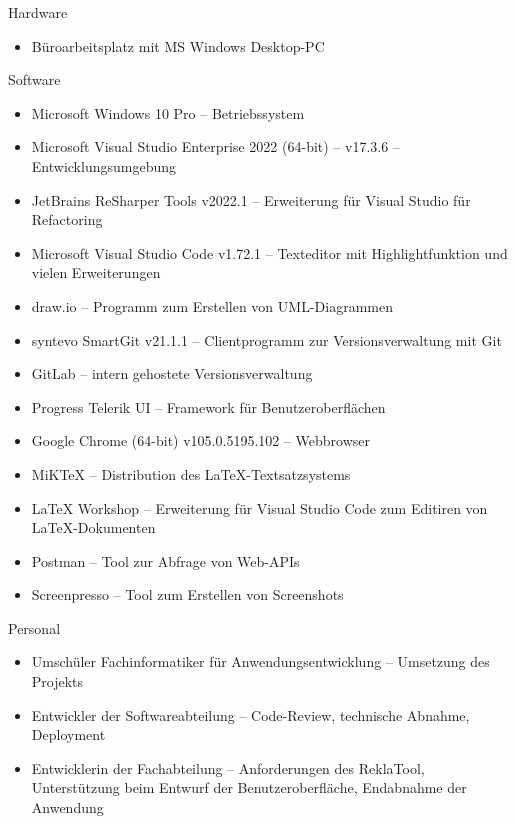 Hardware
\begin{itemize}
    \item Büroarbeitsplatz mit MS Windows Desktop-PC
\end{itemize}
Software
\begin{itemize}
    \item Microsoft Windows 10 Pro -- Betriebssystem
    \item Microsoft Visual Studio Enterprise 2022 (64-bit) -- v17.3.6 -- Entwicklungsumgebung
    \item JetBrains ReSharper Tools v2022.1 -- Erweiterung für Visual Studio für \ua Refactoring
    \item Microsoft Visual Studio Code v1.72.1 -- Texteditor mit Highlightfunktion und vielen Erweiterungen
    \item draw.io -- Programm zum Erstellen von UML-Diagrammen
    \item syntevo SmartGit v21.1.1 -- Clientprogramm zur Versionsverwaltung mit Git
    \item GitLab -- intern gehostete Versionsverwaltung
    \item Progress Telerik UI -- Framework für Benutzeroberflächen
    \item Google Chrome (64-bit) v105.0.5195.102 -- Webbrowser
    \item MiKTeX -- Distribution des LaTeX-Textsatzsystems
    \item LaTeX Workshop -- Erweiterung für Visual Studio Code zum Editiren von LaTeX-Dokumenten
    \item Postman -- Tool zur Abfrage von Web-APIs
    \item Screenpresso -- Tool zum Erstellen von Screenshots
\end{itemize}
Personal
\begin{itemize}
    \item Umschüler Fachinformatiker für Anwendungsentwicklung -- Umsetzung des Projekts
    \item Entwickler der Softwareabteilung  -- Code-Review, technische Abnahme, Deployment
    \item Entwicklerin der Fachabteilung -- Anforderungen des ReklaTool, Unterstützung beim Entwurf der Benutzeroberfläche,
    Endabnahme der Anwendung
\end{itemize}
